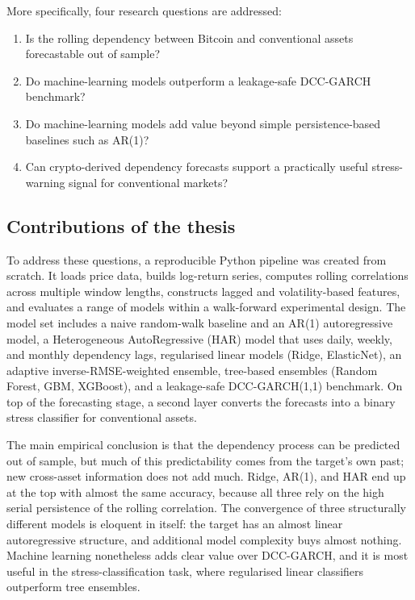 More specifically, four research questions are addressed:

\begin{enumerate}
    \item Is the rolling dependency between Bitcoin and conventional assets forecastable out of sample?
    \item Do machine-learning models outperform a leakage-safe DCC-GARCH benchmark?
    \item Do machine-learning models add value beyond simple persistence-based baselines such as AR(1)?
    \item Can crypto-derived dependency forecasts support a practically useful stress-warning signal for conventional markets?
\end{enumerate}

\subsection{Contributions of the thesis}

To address these questions, a reproducible Python pipeline was created from scratch. It loads price data, builds log-return series, computes rolling correlations across multiple window lengths, constructs lagged and volatility-based features, and evaluates a range of models within a walk-forward experimental design. The model set includes a naive random-walk baseline and an AR(1) autoregressive model, a Heterogeneous AutoRegressive (HAR) model that uses daily, weekly, and monthly dependency lags, regularised linear models (Ridge, ElasticNet), an adaptive inverse-RMSE-weighted ensemble, tree-based ensembles (Random Forest, GBM, XGBoost), and a leakage-safe DCC-GARCH(1,1) benchmark. On top of the forecasting stage, a second layer converts the forecasts into a binary stress classifier for conventional assets.

The main empirical conclusion is that the dependency process can be predicted out of sample, but much of this predictability comes from the target's own past; new cross-asset information does not add much. Ridge, AR(1), and HAR end up at the top with almost the same accuracy, because all three rely on the high serial persistence of the rolling correlation. The convergence of three structurally different models is eloquent in itself: the target has an almost linear autoregressive structure, and additional model complexity buys almost nothing. Machine learning nonetheless adds clear value over DCC-GARCH, and it is most useful in the stress-classification task, where regularised linear classifiers outperform tree ensembles.

